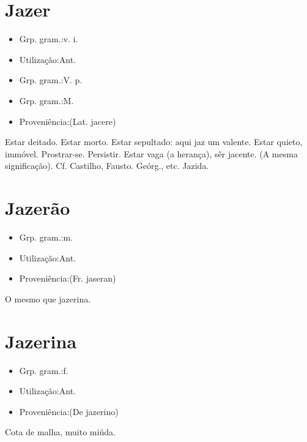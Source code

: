 \documentclass{article}
\begin{document}
\section{Jazer}
\begin{itemize}
\item {Grp. gram.:v. i.}
\end{itemize}
\begin{itemize}
\item {Utilização:Ant.}
\end{itemize}
\begin{itemize}
\item {Grp. gram.:V. p.}
\end{itemize}
\begin{itemize}
\item {Grp. gram.:M.}
\end{itemize}
\begin{itemize}
\item {Proveniência:(Lat. \textunderscore jacere\textunderscore )}
\end{itemize}
Estar deitado.
Estar morto.
Estar sepultado: \textunderscore aqui jaz um valente\textunderscore .
Estar quieto, immóvel.
Prostrar-se.
Persistir.
Estar vaga (a herança), sêr jacente.
(A mesma significação). Cf. Castilho, \textunderscore Fausto. Geórg.\textunderscore , etc.
Jazida.
\section{Jazerão}
\begin{itemize}
\item {Grp. gram.:m.}
\end{itemize}
\begin{itemize}
\item {Utilização:Ant.}
\end{itemize}
\begin{itemize}
\item {Proveniência:(Fr. \textunderscore jaseran\textunderscore )}
\end{itemize}
O mesmo que \textunderscore jazerina\textunderscore .
\section{Jazerina}
\begin{itemize}
\item {Grp. gram.:f.}
\end{itemize}
\begin{itemize}
\item {Utilização:Ant.}
\end{itemize}
\begin{itemize}
\item {Proveniência:(De \textunderscore jazerino\textunderscore )}
\end{itemize}
Cota de malha, muito miúda.
\end{document}
